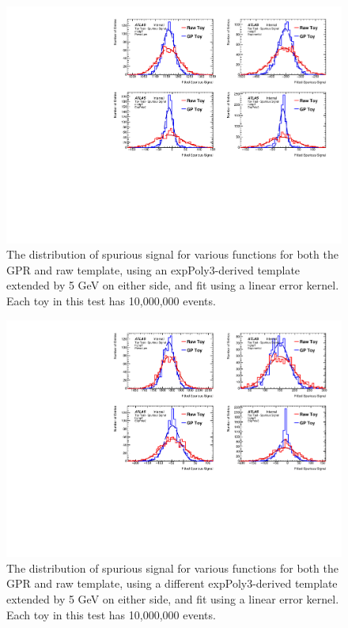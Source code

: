\begin{figure} 
\begin{center}
  \includegraphics[width=\textwidth]{figures/background/gpr/validation/linear/ToyTest_FitSigVals_medpT_10M_noSig}   
\caption{The distribution of spurious signal for various functions for both the GPR and raw template, using an expPoly3-derived template extended by 5 GeV on either side, and fit using a linear error kernel. Each toy in this test has 10,000,000 events.}
\label{fig:linearkernel_medpt_10M_noSig}
\end{center}
\end{figure}

\begin{figure} 
\begin{center}
  \includegraphics[width=\textwidth]{figures/background/gpr/validation/linear/ToyTest_FitSigVals_highpT_10M_noSig}   
\caption{The distribution of spurious signal for various functions for both the GPR and raw template, using a different expPoly3-derived template extended by 5 GeV on either side, and fit using a linear error kernel. Each toy in this test has 10,000,000 events.}
\label{fig:linearkernel_highpt_10M_noSig}
\end{center}
\end{figure}


